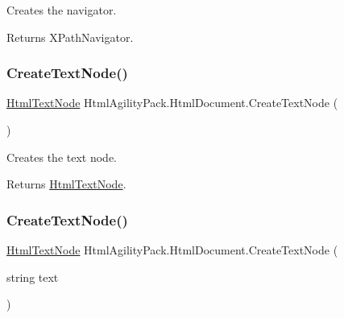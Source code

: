 Creates the navigator. 

\begin{DoxyReturn}{Returns}
X\+Path\+Navigator.
\end{DoxyReturn}
\mbox{\label{class_html_agility_pack_1_1_html_document_a99b02a7976586083216b10c859f51535}} 
\subsubsection{\texorpdfstring{Create\+Text\+Node()}{CreateTextNode()}\hspace{0.1cm}{\footnotesize\ttfamily [1/2]}}
{\footnotesize\ttfamily \hyperlink{class_html_agility_pack_1_1_html_text_node}{Html\+Text\+Node} Html\+Agility\+Pack.\+Html\+Document.\+Create\+Text\+Node (\begin{DoxyParamCaption}{ }\end{DoxyParamCaption})\hspace{0.3cm}{\ttfamily [inline]}}



Creates the text node. 

\begin{DoxyReturn}{Returns}
\hyperlink{class_html_agility_pack_1_1_html_text_node}{Html\+Text\+Node}.
\end{DoxyReturn}
\mbox{\label{class_html_agility_pack_1_1_html_document_a533a68a21e689842a948caa6df3e99e5}} 
\subsubsection{\texorpdfstring{Create\+Text\+Node()}{CreateTextNode()}\hspace{0.1cm}{\footnotesize\ttfamily [2/2]}}
{\footnotesize\ttfamily \hyperlink{class_html_agility_pack_1_1_html_text_node}{Html\+Text\+Node} Html\+Agility\+Pack.\+Html\+Document.\+Create\+Text\+Node (\begin{DoxyParamCaption}\item[{string}]{text }\end{DoxyParamCaption})\hspace{0.3cm}{\ttfamily [inline]}}



